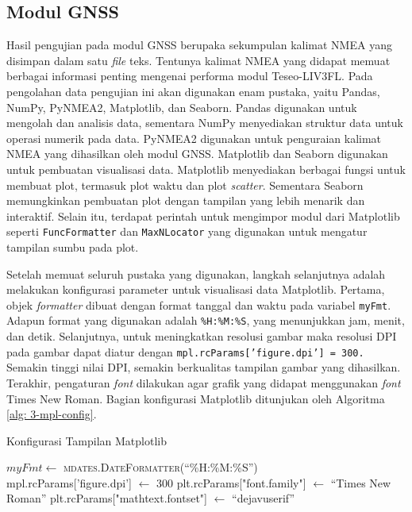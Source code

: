 \subsection{Modul GNSS}
Hasil pengujian pada modul GNSS berupaka sekumpulan kalimat NMEA yang disimpan dalam satu \textit{file} teks. Tentunya kalimat NMEA yang didapat memuat berbagai informasi penting mengenai performa modul Teseo\hyp{}LIV3FL. Pada pengolahan data pengujian ini akan digunakan enam pustaka, yaitu Pandas, NumPy, PyNMEA2, Matplotlib, dan Seaborn. Pandas digunakan untuk mengolah dan analisis data, sementara NumPy menyediakan struktur data untuk operasi numerik pada data. PyNMEA2 digunakan untuk penguraian kalimat NMEA yang dihasilkan oleh modul GNSS. Matplotlib dan Seaborn digunakan untuk pembuatan visualisasi data. Matplotlib menyediakan berbagai fungsi untuk membuat plot, termasuk plot waktu dan plot \textit{scatter}. Sementara Seaborn memungkinkan pembuatan plot dengan tampilan yang lebih menarik dan interaktif. Selain itu, terdapat perintah untuk mengimpor modul dari Matplotlib seperti \texttt{FuncFormatter} dan \texttt{MaxNLocator} yang digunakan untuk mengatur tampilan sumbu pada plot.

Setelah memuat seluruh pustaka yang digunakan, langkah selanjutnya adalah melakukan konfigurasi parameter untuk visualisasi data Matplotlib. Pertama, objek \textit{formatter} dibuat dengan format tanggal dan waktu pada variabel \texttt{myFmt}. Adapun format yang digunakan adalah \texttt{\%H:\%M:\%S}, yang menunjukkan jam, menit, dan detik. Selanjutnya, untuk meningkatkan resolusi gambar maka resolusi DPI pada gambar dapat diatur dengan \texttt{mpl.rcParams['figure.dpi'] = 300.} Semakin tinggi nilai DPI, semakin berkualitas tampilan gambar yang dihasilkan. Terakhir, pengaturan \textit{font} dilakukan agar grafik yang didapat menggunakan \textit{font} Times New Roman. Bagian konfigurasi Matplotlib ditunjukan oleh Algoritma \ref{alg: 3-mpl-config}.

\begin{algorithm}[H]
	\caption{Konfigurasi Tampilan Matplotlib}
	\label{alg: 3-mpl-config}
	\begin{algorithmic}[1]
	\State $myFmt \gets$ \textsc{mdates.DateFormatter}(``\%H:\%M:\%S'') 
	\\
	\State mpl.rcParams['figure.dpi'] $\gets$ 300
	\State plt.rcParams["font.family"] $\gets$ ``Times New Roman''
	\State plt.rcParams["mathtext.fontset"] $\gets$ ``dejavuserif''		
	\end{algorithmic}
\end{algorithm}


